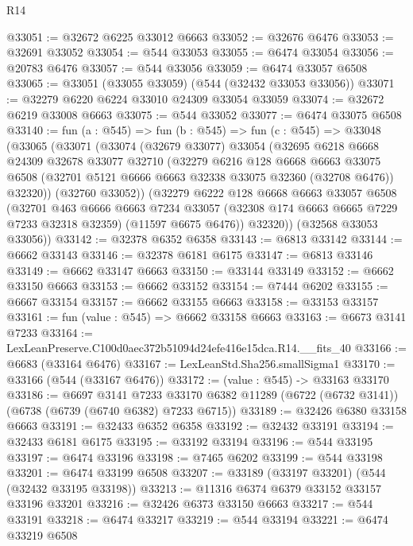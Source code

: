 \begin{lexlean}{R14}
\begin{coremodule}
@33051 := @32672 @6225 @33012 @6663
@33052 := @32676 @6476
@33053 := @32691 @33052
@33054 := @544 @33053
@33055 := @6474 @33054
@33056 := @20783 @6476
@33057 := @544 @33056
@33059 := @6474 @33057 @6508
@33065 := @33051 (@33055 @33059) (@544 (@32432 @33053 @33056))
@33071 := @32279 @6220 @6224 @33010 @24309 @33054 @33059
@33074 := @32672 @6219 @33008 @6663
@33075 := @544 @33052
@33077 := @6474 @33075 @6508
@33140 := fun (a : @545) =>
  fun (b : @545) =>
  fun (c : @545) =>
  @33048
    (@33065
      (@33071
        (@33074
          (@32679 @33077)
          @33054
          (@32695
            @6218
            @6668
            @24309
            @32678
            @33077
            @32710
            (@32279
              @6216
              @128
              @6668
              @6663
              @33075
              @6508
              (@32701 @5121 @6666 @6663 @32338 @33075 @32360 (@32708 @6476))
              @32320))
          (@32760 @33052))
        (@32279
          @6222
          @128
          @6668
          @6663
          @33057
          @6508
          (@32701
            @463
            @6666
            @6663
            @7234
            @33057
            (@32308 @174 @6663 @6665 @7229 @7233 @32318 @32359)
            (@11597 @6675 @6476))
          @32320))
      (@32568 @33053 @33056))
@33142 := @32378 @6352 @6358
@33143 := @6813 @33142
@33144 := @6662 @33143
@33146 := @32378 @6181 @6175
@33147 := @6813 @33146
@33149 := @6662 @33147 @6663
@33150 := @33144 @33149
@33152 := @6662 @33150 @6663
@33153 := @6662 @33152
@33154 := @7444 @6202
@33155 := @6667 @33154
@33157 := @6662 @33155 @6663
@33158 := @33153 @33157
@33161 := fun (value : @545) => @6662 @33158 @6663
@33163 := @6673 @3141 @7233
@33164 := LexLeanPreserve.C100d0aec372b51094d24efe416e15dca.R14.__fits_40
@33166 := @6683 (@33164 @6476)
@33167 := LexLeanStd.Sha256.smallSigma1
@33170 := @33166 (@544 (@33167 @6476))
@33172 := (value : @545) -> @33163 @33170
@33186 := @6697
    @3141
    @7233
    @33170
    @6382
    @11289
    (@6722 (@6732 @3141))
    (@6738 (@6739 (@6740 @6382) @7233 @6715))
@33189 := @32426 @6380 @33158 @6663
@33191 := @32433 @6352 @6358
@33192 := @32432 @33191
@33194 := @32433 @6181 @6175
@33195 := @33192 @33194
@33196 := @544 @33195
@33197 := @6474 @33196
@33198 := @7465 @6202
@33199 := @544 @33198
@33201 := @6474 @33199 @6508
@33207 := @33189 (@33197 @33201) (@544 (@32432 @33195 @33198))
@33213 := @11316 @6374 @6379 @33152 @33157 @33196 @33201
@33216 := @32426 @6373 @33150 @6663
@33217 := @544 @33191
@33218 := @6474 @33217
@33219 := @544 @33194
@33221 := @6474 @33219 @6508

\end{coremodule}
\end{lexlean}
